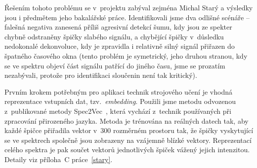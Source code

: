 \documentclass[a4paper,11pt]{article}
\begin{document}
Řešením tohoto problému se v~projektu zabýval zejména Michal Starý a výsledky jsou i předmětem jeho bakalářské práce.
Identifikovali jsme dva odlišné scénáře -- falešná negativa zanesená příliš agresivní detekcí šumu, kdy jsou ze spekter
chybně odstraněny špičky slabého signálu, a chybějící špičky v~důsledku nedokonalé dekonvoluce, kdy je zpravidla
i relativně silný signál přiřazen do špatného časového okna (tento problém je symetrický, jeho druhou stranou, kdy se 
ve spektru objeví část signálu patřící do jiného času, jsme se prozatím nezabývali, protože pro identifikaci sloučenin
není tak kritický).


Prvním krokem potřebným pro aplikaci technik strojového učení je vhodná reprezentace 
vstupních dat, tzv.~\emph{embedding}. Použili jsme metodu odvozenou z~publikované metody Spec2Vec~\cite{spec2vec},
která vychází z~technik používaných při zpracování přirozeného jazyka.
Metoda je trénována na reálných datech tak, aby každé špičce přiřadila vektor v~300 rozměrném prostoru tak,
že špičky vyskytující se ve spektrech společně jsou zobrazeny na vzájemně blízké vektory.
Reprezentací celého spektra je pak součet vektorů jednotlivých špiček vážený jejich intenzitou.
Detaily viz příloha~C práce~\ref{stary}.
\end{document}

